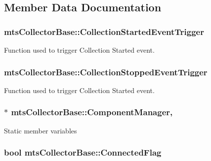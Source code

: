 \subsection{Member Data Documentation}
\hypertarget{classmts_collector_base_aad959016aa62b9f20980c7cb61ccba8a}{
\subsubsection[{Collection\-Started\-Event\-Trigger}]{ mts\-Collector\-Base\-::\-Collection\-Started\-Event\-Trigger}}\label{classmts_collector_base_aad959016aa62b9f20980c7cb61ccba8a}
Function used to trigger Collection Started event. \hypertarget{classmts_collector_base_a8caa04305488581107b1ad19087079a2}{
\subsubsection[{Collection\-Stopped\-Event\-Trigger}]{ mts\-Collector\-Base\-::\-Collection\-Stopped\-Event\-Trigger}}\label{classmts_collector_base_a8caa04305488581107b1ad19087079a2}
Function used to trigger Collection Started event. \hypertarget{classmts_collector_base_a5d4cca6b7e903dec79a349efc63ba8a0}{
\subsubsection[{Component\-Manager}]{$\ast$ mts\-Collector\-Base\-::\-Component\-Manager\hspace{0.3cm}{\ttfamily [static]}, {\ttfamily [protected]}}}\label{classmts_collector_base_a5d4cca6b7e903dec79a349efc63ba8a0}
Static member variables \hypertarget{classmts_collector_base_a68e1ba8a88b403471103ad596fd3f002}{
\subsubsection[{Connected\-Flag}]{\setlength{\rightskip}{0pt plus 5cm}bool mts\-Collector\-Base\-::\-Connected\-Flag\hspace{0.3cm}{\ttfamily [protected]}}}\label{classmts_collector_base_a68e1ba8a88b403471103ad596fd3f002}
